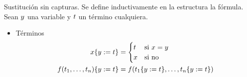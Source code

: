 \begin{definition}{Sustitución sin capturas}. Se define inductivamente en la estructura la fórmula. Sean $y$ una variable y $t$ un término cualquiera.
    \begin{itemize}
        \item Términos
        \begin{align*}
            x\{y := t\} &= \begin{cases}
                t &\text{si } x = y\\
                x &\text{si no}
            \end{cases}\\
            f(t_1, \dots, t_n)\{y := t\} &=
                f(
                    t_1\{y := t\},
                    \dots,
                    t_n\{y := t\}
                )
        \end{align*}


\end{itemize}
\end{definition}
